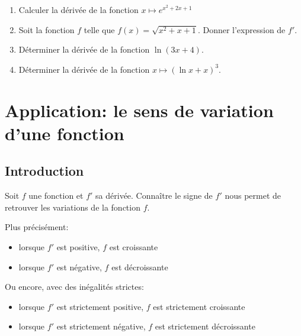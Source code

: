 \documentclass[a4paper,12pt]{scrartcl}
\begin{document}
\begin{enumerate}
 \item Calculer la dérivée de la fonction $x \longmapsto e^{x^2 + 2x + 1}$


 \item Soit la fonction $f$ telle que $f(x) = \sqrt{x^2 + x + 1}$. Donner l'expression de $f'$.
 

 \item Déterminer la dérivée de la fonction $\ln (3x+4)$.
 

 \item Déterminer la dérivée de la fonction $x \longmapsto (\ln x + x)^3$.
 
\end{enumerate}


\section{Application: le sens de variation d'une fonction}

\subsection{Introduction}

Soit $f$ une fonction et $f'$ sa dérivée. Connaître le signe de $f'$ nous permet de retrouver les variations de la fonction $f$. 

Plus précisément:

\begin{itemize}
 \item lorsque $f'$ est positive, $f$ est croissante
 \item lorsque $f'$ est négative, $f$ est décroissante
\end{itemize}

Ou encore, avec des inégalités strictes:

\begin{itemize}
 \item lorsque $f'$ est strictement positive, $f$ est strictement croissante
 \item lorsque $f'$ est strictement négative, $f$ est strictement décroissante
\end{itemize}
\end{document}
